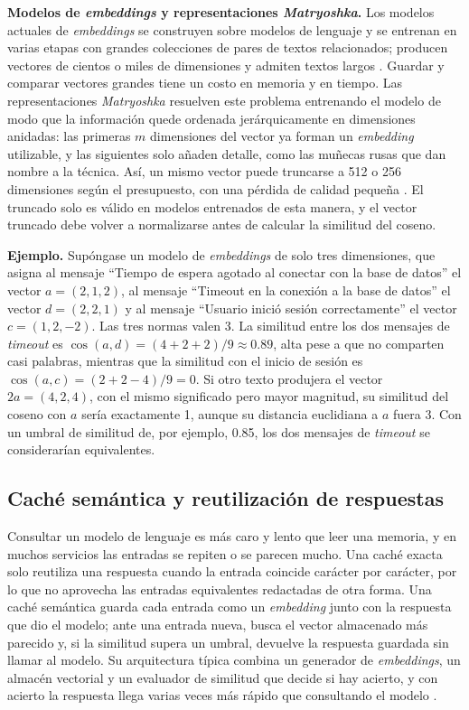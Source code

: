 \textbf{Modelos de \textit{embeddings} y representaciones \textit{Matryoshka}.} Los modelos actuales de \textit{embeddings} se construyen sobre modelos de lenguaje y se entrenan en varias etapas con grandes colecciones de pares de textos relacionados; producen vectores de cientos o miles de dimensiones y admiten textos largos \cite{zhang2025_qwen3emb}. Guardar y comparar vectores grandes tiene un costo en memoria y en tiempo. Las representaciones \textit{Matryoshka} resuelven este problema entrenando el modelo de modo que la información quede ordenada jerárquicamente en dimensiones anidadas: las primeras $m$ dimensiones del vector ya forman un \textit{embedding} utilizable, y las siguientes solo añaden detalle, como las muñecas rusas que dan nombre a la técnica. Así, un mismo vector puede truncarse a 512 o 256 dimensiones según el presupuesto, con una pérdida de calidad pequeña \cite{kusupati2022_matryoshka}. El truncado solo es válido en modelos entrenados de esta manera, y el vector truncado debe volver a normalizarse antes de calcular la similitud del coseno.

\textbf{Ejemplo.} Supóngase un modelo de \textit{embeddings} de solo tres dimensiones, que asigna al mensaje ``Tiempo de espera agotado al conectar con la base de datos'' el vector $a = (2, 1, 2)$, al mensaje ``Timeout en la conexión a la base de datos'' el vector $d = (2, 2, 1)$ y al mensaje ``Usuario inició sesión correctamente'' el vector $c = (1, 2, -2)$. Las tres normas valen 3. La similitud entre los dos mensajes de \textit{timeout} es $\cos(a, d) = (4 + 2 + 2)/9 \approx 0.89$, alta pese a que no comparten casi palabras, mientras que la similitud con el inicio de sesión es $\cos(a, c) = (2 + 2 - 4)/9 = 0$. Si otro texto produjera el vector $2a = (4, 2, 4)$, con el mismo significado pero mayor magnitud, su similitud del coseno con $a$ sería exactamente 1, aunque su distancia euclidiana a $a$ fuera 3. Con un umbral de similitud de, por ejemplo, 0.85, los dos mensajes de \textit{timeout} se considerarían equivalentes.

\subsection{Caché semántica y reutilización de respuestas}\label{sec:mt_cache}

Consultar un modelo de lenguaje es más caro y lento que leer una memoria, y en muchos servicios las entradas se repiten o se parecen mucho. Una caché exacta solo reutiliza una respuesta cuando la entrada coincide carácter por carácter, por lo que no aprovecha las entradas equivalentes redactadas de otra forma. Una caché semántica guarda cada entrada como un \textit{embedding} junto con la respuesta que dio el modelo; ante una entrada nueva, busca el vector almacenado más parecido y, si la similitud supera un umbral, devuelve la respuesta guardada sin llamar al modelo. Su arquitectura típica combina un generador de \textit{embeddings}, un almacén vectorial y un evaluador de similitud que decide si hay acierto, y con acierto la respuesta llega varias veces más rápido que consultando el modelo \cite{fu2023_gptcache}.

